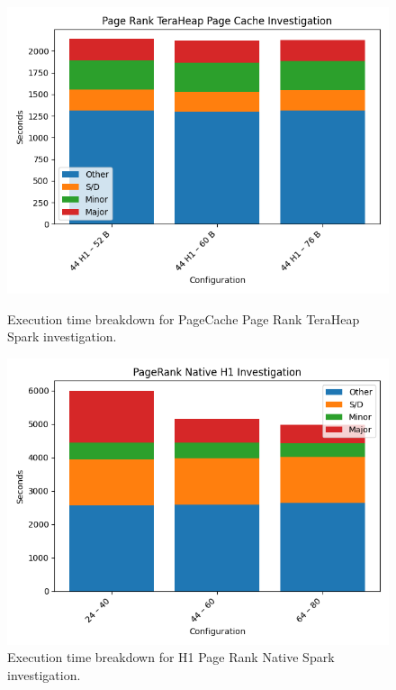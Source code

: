 \begin{figure}[thbp]
    \includegraphics[width=\linewidth]{./fig/pr_pc_th.png}
    \caption{Execution time breakdown for PageCache Page Rank TeraHeap
    Spark investigation.}
    \label{fig:pr_pc_th}

    \includegraphics[width=\linewidth]{./fig/pr_h1_native.png}
    \caption{Execution time breakdown for H1 Page Rank Native
    Spark investigation.}
    \label{fig:pr_h1_native}
\end{figure}

